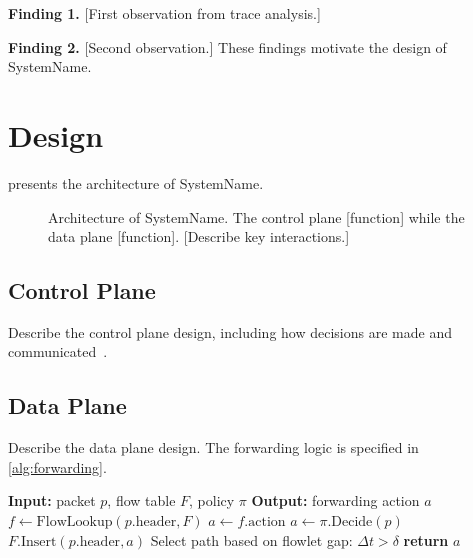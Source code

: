\documentclass[letterpaper,twocolumn,10pt]{article}
\newcommand{\system}{SystemName\xspace}
\newcommand{\para}[1]{\smallskip\noindent\textbf{#1.}}
\begin{document}
\para{Finding 1}
[First observation from trace analysis.]

\para{Finding 2}
[Second observation.] These findings motivate the design of \system.

\section{Design}
\label{sec:design}

 presents the architecture of \system.

\begin{figure}[t]
  \centering
  \caption{Architecture of \system. The control plane [function] while
    the data plane [function]. [Describe key interactions.]}
  \label{fig:architecture}
\end{figure}

\subsection{Control Plane}

Describe the control plane design, including how decisions are made
and communicated~\cite{patel2013ananta}.

\subsection{Data Plane}

Describe the data plane design. The forwarding logic is specified
in \cref{alg:forwarding}.

\begin{algorithm}[t]
  \caption{Packet processing in \system}
  \label{alg:forwarding}
  \begin{algorithmic}[1]
    \STATE \textbf{Input:} packet $p$, flow table $F$, policy $\pi$
    \STATE \textbf{Output:} forwarding action $a$
    \STATE $f \leftarrow \text{FlowLookup}(p.\text{header}, F)$
      \STATE $a \leftarrow f.\text{action}$ 
    \ELSE
      \STATE $a \leftarrow \pi.\text{Decide}(p)$ 
      \STATE $F.\text{Insert}(p.\text{header}, a)$
    \ENDIF
      \STATE Select path based on flowlet gap: $\Delta t > \delta$
    \ENDIF
    \STATE \textbf{return} $a$
  \end{algorithmic}
\end{algorithm}
\end{document}
